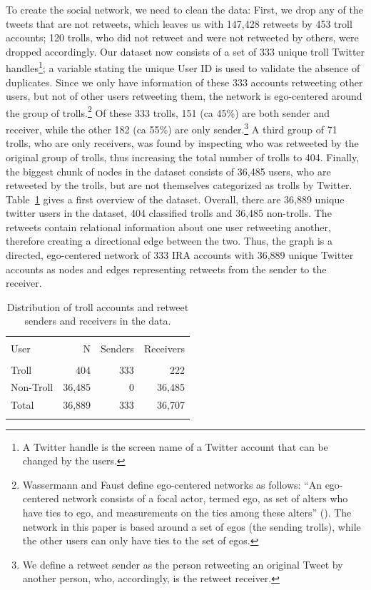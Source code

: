 \documentclass[12pt, titlepage=true, toc=bib]{scrartcl}
\begin{document}
To create the social network, we need to clean the data: First, we drop any of the tweets that are not retweets, which leaves us with 147,428 retweets by 453 troll accounts; 120 trolls, who did not retweet and were not retweeted by others, were dropped accordingly. Our dataset now consists of a set of 333 unique troll Twitter handles\footnote{A Twitter handle is the screen name of a Twitter account that can be changed by the users.}; a variable stating the unique User ID is used to validate the absence of duplicates. Since we only have information of these 333 accounts retweeting other users, but not of other users retweeting them, the network is ego-centered around the group of trolls.\footnote{Wassermann and Faust define ego-centered networks as follows: ``An ego-centered network consists of a focal actor, termed ego, as set of alters who have ties to ego, and measurements on the ties among these alters'' (\cite[42]{wasserman_social_1994}). The network in this paper is based around a set of egos (the sending trolls), while the other users can only have ties to the set of egos.} Of these 333 trolls, 151 (ca 45\%) are both sender and receiver, while the other 182 (ca 55\%) are only sender.\footnote{We define a retweet sender as the person retweeting an original Tweet by another person, who, accordingly, is the retweet receiver.} A third group of 71 trolls, who are only receivers, was found by inspecting who was retweeted by the original group of trolls, thus increasing the total number of trolls to 404. Finally, the biggest chunk of nodes in the dataset consists of 36,485 users, who are retweeted by the trolls, but are not themselves categorized as trolls by Twitter. Table~\ref{tab:userstat} gives a first overview of the dataset. Overall, there are 36,889 unique twitter users in the dataset, 404 classified trolls and 36,485 non-trolls. The retweets contain relational information about one user retweeting another, therefore creating a directional edge between the two. Thus, the graph is a directed, ego-centered network of 333 IRA accounts with 36,889 unique Twitter accounts as nodes and edges representing retweets from the sender to the receiver.

\begin{table}[!ht] \centering 
\begin{tabular*}{.95\linewidth}{@{\extracolsep{\fill}} lrrr} 
\\[-1.8ex]\hline 
\hline \\[-1.8ex] 
User & N & Senders & Receivers \\ 
\hline \\[-1.8ex] 
Troll & 404 & 333 & 222 \\ 
Non-Troll & 36,485 & 0 & 36,485 \\ 
Total & 36,889 & 333 & 36,707 \\ 
\hline \\[-1.8ex] 
\end{tabular*} 
  \caption[User Statistics]{Distribution of troll accounts and retweet senders and receivers in the data.}
  \label{tab:userstat} 
\end{table} 
\end{document}
